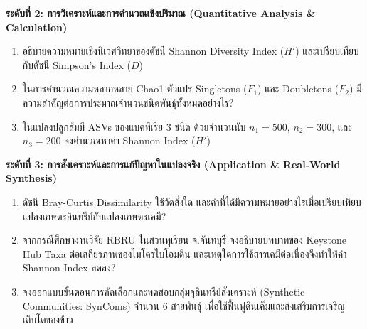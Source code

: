 \noindent \textbf{ระดับที่ 2: การวิเคราะห์และการคำนวณเชิงปริมาณ (Quantitative Analysis \& Calculation)}
\begin{enumerate}[resume]
    \item อธิบายความหมายเชิงนิเวศวิทยาของดัชนี Shannon Diversity Index ($H'$) และเปรียบเทียบกับดัชนี Simpson's Index ($D$)
    \item ในการคำนวณความหลากหลาย Chao1 ตัวแปร Singletons ($F_1$) และ Doubletons ($F_2$) มีความสำคัญต่อการประมาณจำนวนชนิดพันธุ์ทั้งหมดอย่างไร?
    \item ในแปลงปลูกส้มมี ASVs ของแบคทีเรีย 3 ชนิด ด้วยจำนวนนับ $n_1 = 500$, $n_2 = 300$, และ $n_3 = 200$ จงคำนวณหาค่า Shannon Index ($H'$)
\end{enumerate}

\noindent \textbf{ระดับที่ 3: การสังเคราะห์และการแก้ปัญหาในแปลงจริง (Application \& Real-World Synthesis)}
\begin{enumerate}[resume]
    \item ดัชนี Bray-Curtis Dissimilarity ใช้วัดสิ่งใด และค่าที่ได้มีความหมายอย่างไรเมื่อเปรียบเทียบแปลงเกษตรอินทรีย์กับแปลงเกษตรเคมี?
    \item จากกรณีศึกษางานวิจัย RBRU ในสวนทุเรียน จ.จันทบุรี จงอธิบายบทบาทของ Keystone Hub Taxa ต่อเสถียรภาพของไมโครไบโอมดิน และเหตุใดการใช้สารเคมีต่อเนื่องจึงทำให้ค่า Shannon Index ลดลง?
    \item จงออกแบบขั้นตอนการคัดเลือกและทดสอบกลุ่มจุลินทรีย์สังเคราะห์ (Synthetic Communities: SynComs) จำนวน 6 สายพันธุ์ เพื่อใช้ฟื้นฟูดินเค็มและส่งเสริมการเจริญเติบโตของข้าว
\end{enumerate}
